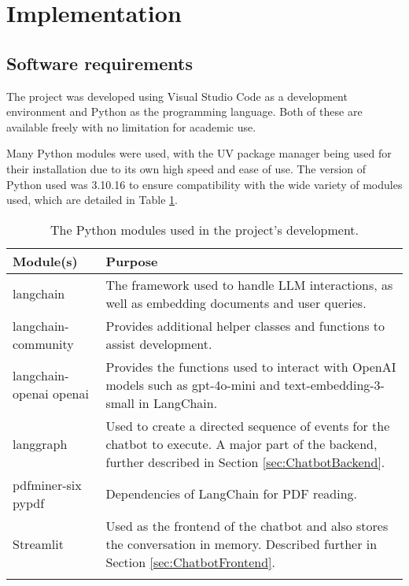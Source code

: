 \section{Implementation}\label{sec:Implementation}

\subsection{Software requirements}
The project was developed using Visual Studio Code as a development environment and Python as the programming language.
Both of these are available freely with no limitation for academic use.

\para Many Python modules were used, with the UV package manager \autocite{astralUv} being used for their installation 
due to its own high speed and ease of use. The version of Python used was 3.10.16 to ensure compatibility with the wide variety 
of modules used, which are detailed in Table \ref{tab:PythonModules}.

\begin{longtable}{ | p{} | p{} | }
    \hline
    \cellcolor{blue!25} Module(s) & \cellcolor{blue!25} Purpose \\
    \hline
    langchain & The framework used to handle LLM interactions, as well as embedding documents and user queries. \\
    \hline
    langchain-community & Provides additional helper classes and functions to assist development. \\
    \hline 
    langchain-openai \newline 
    openai & Provides the functions used to interact with OpenAI models such as gpt-4o-mini and text-embedding-3-small in LangChain. \\
    \hline 
    langgraph & Used to create a directed sequence of events for the chatbot to execute. A major part of the backend, further described 
    in Section \ref{sec:ChatbotBackend}. \\
    \hline
    pdfminer-six \newline 
    pypdf & Dependencies of LangChain for PDF reading. \\
    \hline 
    Streamlit & Used as the frontend of the chatbot and also stores the conversation in memory. Described further in Section 
    \ref{sec:ChatbotFrontend}. \\
    \hline
    \caption{The Python modules used in the project's development.}\label{tab:PythonModules}
\end{longtable}



